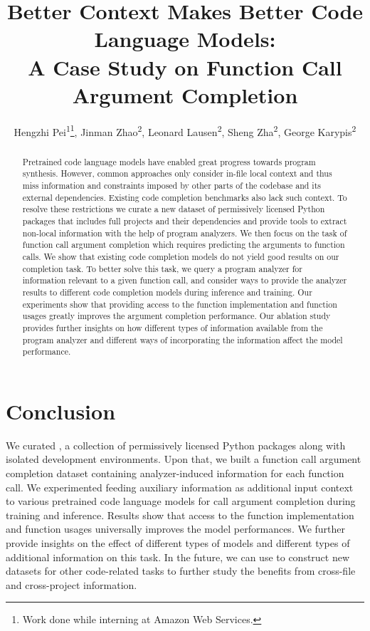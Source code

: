 \documentclass[letterpaper]{article} %
\title{Better Context Makes Better Code Language Models: \\
A Case Study on Function Call Argument Completion}
\author{
    Hengzhi Pei\textsuperscript{\rm 1}\thanks{Work done while interning at Amazon Web Services.},
    Jinman Zhao\textsuperscript{\rm 2},
    Leonard Lausen\textsuperscript{\rm 2},
    Sheng Zha\textsuperscript{\rm 2},
    George Karypis\textsuperscript{\rm 2}
}
\begin{document}
\maketitle

\begin{abstract}
Pretrained code language models have enabled great progress towards program synthesis. However, common approaches only consider in-file local context and thus miss information and constraints imposed by other parts of the codebase and its external dependencies. Existing code completion benchmarks also lack such context. To resolve these restrictions we curate a new dataset of permissively licensed Python packages that includes full projects and their dependencies and provide tools to extract non-local information with the help of program analyzers. We then focus on the task of function call argument completion which requires predicting the arguments to function calls. We show that existing code completion models do not yield good results on our completion task. To better solve this task, we query a program analyzer for information relevant to a given function call, and consider ways to provide the analyzer results to different code completion models during inference and training. Our experiments show that providing access to the function implementation and function usages greatly improves the argument completion performance. Our ablation study provides further insights on how different types of information available from the program analyzer and different ways of incorporating the information affect the model performance.


\end{abstract}












\section{Conclusion}
We curated \PyEnvs, a collection of permissively licensed Python packages along with isolated development environments. 
Upon that, we built a function call argument completion dataset \CallArgs containing analyzer-induced information for each function call. 
We experimented feeding auxiliary information as additional input context to various pretrained code language models for call argument completion during training and inference.
Results show that access to the function implementation and function usages universally improves the model performances.
We further provide insights on the effect of different types of models and different types of additional information on this task.
In the future, we can use \PyEnvs to construct new datasets for other code-related tasks to further study the benefits from cross-file and cross-project information.





\clearpage

\appendix



\end{document}
